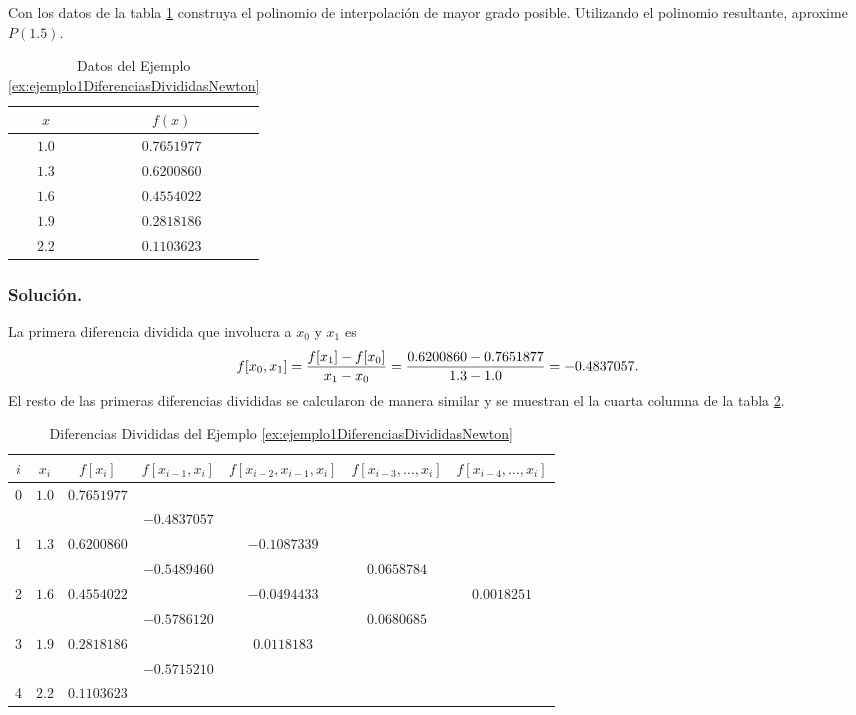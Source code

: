 \begin{example}
\label{ex:ejemplo1DiferenciasDivididasNewton}
{\rm Con los datos de la tabla \ref{table:ejemplo1ADiferenciasDivididasNewton} construya el 
		polinomio de interpolación de mayor grado posible. Utilizando el polinomio resultante, aproxime $P(1.5)$.
	
	\begin{table}[H]
		\label{table:ejemplo1ADiferenciasDivididasNewton}
		\centering
      \begin{tabular}{|c|c|}
				\hline 
				\rowcolor[gray]{0.9} $x$ & $f(x)$\\ \hline
					$1.0$ & $0.7651977$ \\
					$1.3$ & $0.6200860$ \\
					$1.6$ & $0.4554022$ \\
					$1.9$ & $0.2818186$ \\
					$2.2$ & $0.1103623$ \\
				\hline
      	\end{tabular}
      	\caption{Datos del Ejemplo \ref{ex:ejemplo1DiferenciasDivididasNewton}}
	\end{table}	
	
	\subsubsection*{Solución.} La primera diferencia dividida que involucra a $x_0$ y $x_1$ es
		$$f[x_0,x_1] = {f[x_1] - f[x_0]\over x_1 - x_0} = {0.6200860-0.7651877\over 1.3-1.0} = -0.4837057.$$
		El resto de las primeras diferencias divididas se calcularon de manera similar y se muestran el la cuarta columna de la tabla
		\ref{table:ejemplo1BDiferenciasDivididasNewton}.
	
	\begin{table}[H]
		\centering
      \begin{tabular}{|c|c|c|c|c|c|c|}
				\hline 
				\rowcolor[gray]{0.9} $i$ & $x_i$ & $f[x_i]$ & $f[x_{i-1}, x_i]$ & $f[x_{i-2},x_{i-1},x_i]$ & $f[x_{i-3},\dots,x_i]$ & $f[x_{i-4},\dots, x_i]$\\
				 \hline
					0 & $1.0$ & $0.7651977$ & & & & \\ 
						&&&$-0.4837057$&&&\\
					1 & $1.3$ & $0.6200860$ &  & $-0.1087339$ & & \\
						&&&$-0.5489460$&&$0.0658784$&\\
					2 & $1.6$ & $0.4554022$ &  & $-0.0494433$ & & $0.0018251$\\
						&&&$-0.5786120$&&$0.0680685$&\\
					3 & $1.9$ & $0.2818186$ &  & $ 0.0118183$ &  & \\
						&&&$-0.5715210$&&&\\
					4 & $2.2$ & $0.1103623$ &  &  &  &  \\
				\hline
      	\end{tabular}
      	\caption{Diferencias Divididas del Ejemplo \ref{ex:ejemplo1DiferenciasDivididasNewton}}
      	\label{table:ejemplo1BDiferenciasDivididasNewton}
	\end{table}
	
}
\end{example}
